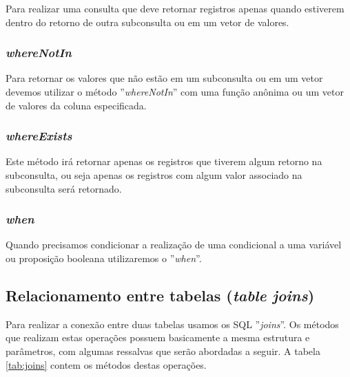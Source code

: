 Para realizar uma consulta que deve retornar registros apenas quando estiverem dentro do retorno de outra subconsulta ou em um vetor de valores.

\spaceH{}

\label{scripts/query_with_where_in.php}

\subsubsection{\textit{whereNotIn}}

Para retornar os valores que não estão em um subconsulta ou em um vetor devemos utilizar o método ''\textit{whereNotIn}'' com uma função anônima ou um vetor de valores da coluna especificada.

\spaceH{}

\label{scripts/query_with_where_not_in.php}

\subsubsection{\textit{whereExists}}

Este método irá retornar apenas os registros que tiverem algum retorno na subconsulta, ou seja apenas os registros com algum valor associado na subconsulta será retornado.

\spaceH{}

\label{scripts/query_with_where_exist.php}

\subsubsection{\textit{when}}

Quando precisamos condicionar a realização de uma condicional a uma variável ou proposição booleana utilizaremos o ''\textit{when}''.

\spaceH{}

\label{scripts/query_with_when.php}

\subsection{Relacionamento entre tabelas (\textit{table joins})}
Para realizar a conexão entre duas tabelas usamos os SQL ''\textit{joins}''. Os métodos que realizam estas operações possuem basicamente a mesma estrutura e parâmetros, com algumas ressalvas que serão abordadas a seguir. A tabela \ref{tab:joins}  contem os métodos destas operações.

